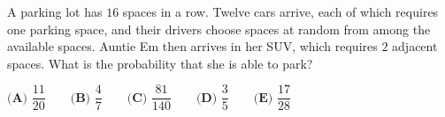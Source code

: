A parking lot has $16$ spaces in a row. Twelve cars arrive, each of which requires one parking space, and their drivers choose spaces at random from among the available spaces. Auntie Em then arrives in her SUV, which requires $2$ adjacent spaces. What is the probability that she is able to park?

$\textbf{(A) }\dfrac{11}{20}\qquad\textbf{(B) }\dfrac47\qquad\textbf{(C) }\dfrac{81}{140}\qquad\textbf{(D) }\dfrac35\qquad\textbf{(E) }\dfrac{17}{28}$
